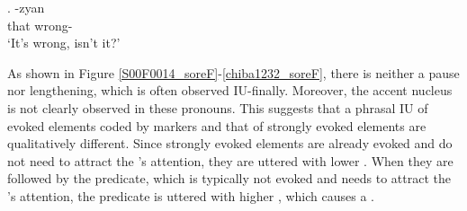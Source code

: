 \exg. \label{chiba1232_sore} \tp{\dvline} -zyan \tp{\dvline} \\
		that {} wrong- {} \\
		`It's wrong, isn't it?'

As shown in Figure \ref{S00F0014_soreF}-\ref{chiba1232_soreF},
there is neither a pause nor  lengthening,
which is often observed IU-finally.
Moreover, the accent nucleus is not clearly observed in these pronouns.
This suggests that
a phrasal IU of evoked elements coded by  markers and
that of strongly evoked elements are qualitatively different.
Since strongly evoked elements are already evoked and do not need to attract the 's attention,
they are uttered with lower .
When they are followed by the predicate, which is typically not evoked and needs to attract the 's attention,
the predicate is uttered with higher ,
which causes a .


